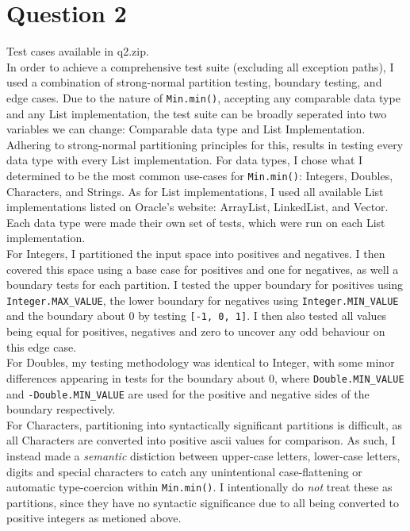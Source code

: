 \documentclass{article}
\begin{document}
\section{Question 2}
Test cases available in q2.zip.\medskip \\
In order to achieve a comprehensive test suite (excluding all exception paths), I used a combination of strong-normal partition testing, boundary testing, and edge cases.
Due to the nature of \lstinline{Min.min()}, accepting any comparable data type and any List implementation, the test suite can be broadly seperated into
two variables we can change: Comparable data type and List Implementation. Adhering to strong-normal partitioning principles for this, results in testing every data type
with every List implementation. For data types, I chose what I determined to be the most common use-cases for \lstinline{Min.min()}: Integers, Doubles, Characters,
and Strings. As for List implementations, I used all available List implementations listed on Oracle's website: ArrayList, LinkedList, and Vector. Each data type
were made their own set of tests, which were run on each List implementation.\medskip \\
For Integers, I partitioned the input space into positives and negatives. I then covered this space using a base case for positives and one for negatives, as well a boundary tests
for each partition. I tested the upper boundary for positives using \lstinline{Integer.MAX_VALUE}, the lower boundary for negatives using \lstinline{Integer.MIN_VALUE} and the boundary
about 0 by testing \lstinline{[-1, 0, 1]}. I then also tested all values being equal for positives, negatives and zero to uncover any odd behaviour on this edge case.\medskip \\
For Doubles, my testing methodology was identical to Integer, with some minor differences appearing in tests for the boundary about 0, where \lstinline{Double.MIN_VALUE} and
\lstinline{-Double.MIN_VALUE} are used for the positive and negative sides of the boundary respectively.\medskip \\
For Characters, partitioning into syntactically significant partitions is difficult, as all Characters are converted into positive ascii values for comparison. As such, I instead
made a \textit{semantic} distiction between upper-case letters, lower-case letters, digits and special characters to catch any unintentional case-flattening or automatic type-coercion within \lstinline{Min.min()}.
I intentionally do \textit{not} treat these as partitions, since they have no syntactic significance due to all being converted to positive integers as metioned above.
\end{document}
